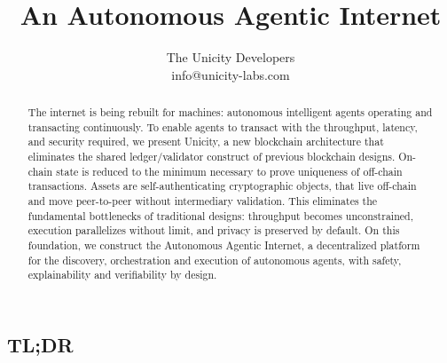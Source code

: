 \documentclass{article}
\title{An Autonomous Agentic Internet}
\author{The Unicity Developers\\info@unicity-labs.com}
\date{} %
\begin{document}
\maketitle
\thispagestyle{titleheader}

\begin{abstract}

The internet is being rebuilt for machines: autonomous intelligent agents operating and transacting continuously. To enable agents to transact with the throughput, latency, and security required, we present Unicity, a new blockchain architecture that eliminates the shared ledger/validator construct of previous blockchain designs. On-chain state is reduced to the minimum necessary to prove uniqueness of off-chain transactions. Assets are self-authenticating cryptographic objects, that live off-chain and move peer-to-peer without intermediary validation. This eliminates the fundamental bottlenecks of traditional designs: throughput becomes unconstrained, execution parallelizes without limit, and privacy is preserved by default. On this foundation, we construct the Autonomous Agentic Internet, a decentralized platform for the discovery, orchestration and execution of autonomous agents, with safety, explainability and verifiability by design.

\end{abstract}

\subsection*{TL;DR}
\end{document}

